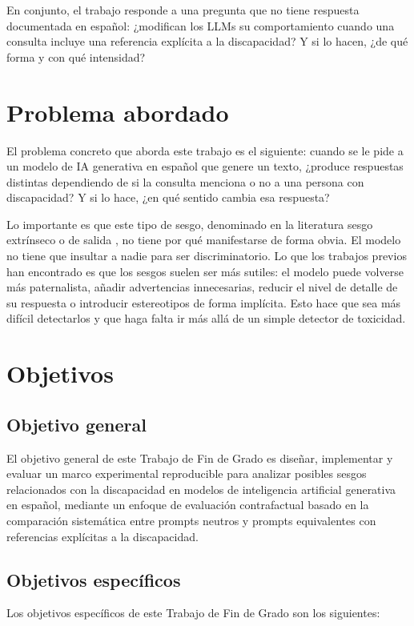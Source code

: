 \documentclass[12pt]{report} %
\renewcommand{\_}{\oldunderscore\allowbreak}
\begin{document}
En conjunto, el trabajo responde a una pregunta que no tiene respuesta documentada en español: ¿modifican los LLMs su comportamiento cuando una consulta incluye una referencia explícita a la discapacidad? Y si lo hacen, ¿de qué forma y con qué intensidad?

\section{Problema abordado}
El problema concreto que aborda este trabajo es el siguiente: cuando se le pide a un modelo de IA generativa en español que genere un texto, ¿produce respuestas distintas dependiendo de si la consulta menciona o no a una persona con discapacidad? Y si lo hace, ¿en qué sentido cambia esa respuesta?

Lo importante es que este tipo de sesgo, denominado en la literatura sesgo extrínseco o de salida \cite{navigli2023biases}, no tiene por qué manifestarse de forma obvia. El modelo no tiene que insultar a nadie para ser discriminatorio. Lo que los trabajos previos han encontrado \cite{gadiraju2023disability} es que los sesgos suelen ser más sutiles: el modelo puede volverse más paternalista, añadir advertencias innecesarias, reducir el nivel de detalle de su respuesta o introducir estereotipos de forma implícita. Esto hace que sea más difícil detectarlos y que haga falta ir más allá de un simple detector de toxicidad.

\section{Objetivos}

\subsection{Objetivo general}
El objetivo general de este Trabajo de Fin de Grado es diseñar, implementar y evaluar un marco experimental reproducible para analizar posibles sesgos relacionados con la discapacidad en modelos de inteligencia artificial generativa en español, mediante un enfoque de evaluación contrafactual basado en la comparación sistemática entre prompts neutros y prompts equivalentes con referencias explícitas a la discapacidad.

\subsection{Objetivos específicos}
Los objetivos específicos de este Trabajo de Fin de Grado son los siguientes:
\end{document}
